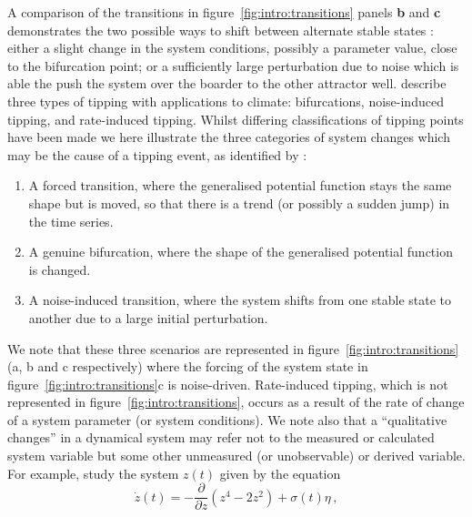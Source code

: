 A comparison of the transitions in figure~\ref{fig:intro:transitions} panels \textbf{b} and \textbf{c} demonstrates the two possible ways to shift between alternate stable states \citep{scheffer2001}: either a slight change in the system conditions, possibly a parameter value, close to the bifurcation point; or a sufficiently large perturbation due to noise which is able the push the system over the boarder to the other attractor well. \citet{ashwin2012} describe three types of tipping with applications to climate: bifurcations, noise-induced tipping, and rate-induced tipping. Whilst differing classifications of tipping points have been made \citep{thompson2011predicting, ashwin2012} we here illustrate the three categories of system changes which may be the cause of a tipping event, as identified by \cite{livina2011}:
\begin{enumerate}
	\item A forced transition, where the generalised potential function stays the same shape but is moved, so that there is a trend (or possibly a sudden jump) in the time series.
	\item A genuine bifurcation, where the shape of the generalised potential function is changed. 
	\item A noise-induced transition, where the system shifts from one stable state to another due to a large initial perturbation.
\end{enumerate}
We note that these three scenarios are represented in figure~\ref{fig:intro:transitions} (a, b and c respectively) where the forcing of the system state in figure~\ref{fig:intro:transitions}c is noise-driven. Rate-induced tipping, which is not represented in figure~\ref{fig:intro:transitions}, occurs as a result of the rate of change of a system parameter (or system conditions). {\Red We note also that a ``qualitative changes'' in a dynamical system may refer not to the measured or calculated system variable but some other unmeasured (or unobservable) or derived variable. For example,} \cite{livina2011} study the system $z(t)$ given by the equation
	\begin{equation}
	\label{noise_wells}
	\dot{z}(t)  = -\frac{\partial}{\partial z}\left(z^4 - 2z^2\right) + \sigma(t)\eta \,,
	\end{equation}
